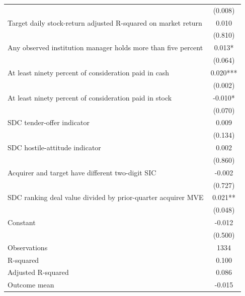 {\begin{tabular}{l*{1}{c}}
                    &     (0.008)   \\
Target daily stock-return adjusted R-squared on market return&       0.010   \\
                    &     (0.810)   \\
Any observed institution manager holds more than five percent&       0.013*  \\
                    &     (0.064)   \\
At least ninety percent of consideration paid in cash&       0.020***\\
                    &     (0.002)   \\
At least ninety percent of consideration paid in stock&      -0.010*  \\
                    &     (0.070)   \\
SDC tender-offer indicator&       0.009   \\
                    &     (0.134)   \\
SDC hostile-attitude indicator&       0.002   \\
                    &     (0.860)   \\
Acquirer and target have different two-digit SIC&      -0.002   \\
                    &     (0.727)   \\
SDC ranking deal value divided by prior-quarter acquirer MVE&       0.021** \\
                    &     (0.048)   \\
Constant            &      -0.012   \\
                    &     (0.500)   \\
\hline
Observations        &        1334   \\
R-squared           &       0.100   \\
Adjusted R-squared  &       0.086   \\
Outcome mean        &      -0.015   \\
\hline\hline
\end{tabular}
}
